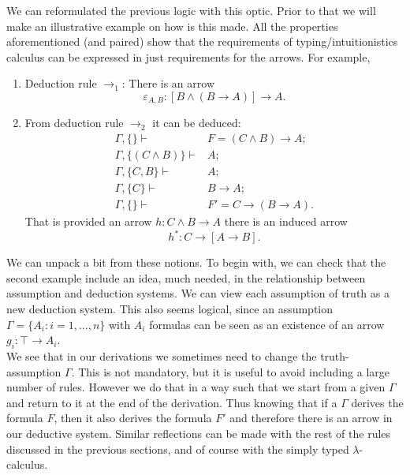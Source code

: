 We can reformulated the previous logic with this optic. Prior to that we will make an illustrative example on how is this made. All the properties aforementioned (and paired) show that the requirements of typing/intuitionistics calculus can be expressed in just requirements for the arrows. For example, 
\begin{example}
  \begin{enumerate}
  \item Deduction rule $\to_1$: There is an arrow $$\varepsilon_{A,B}: [B\land (B \to A)] \to A.$$
  \item From deduction rule $\to_2$ it can be deduced:
    \begin{align*}
      \Gamma,\{\} \vdash & F= (C\land B)\to A;\\
      \Gamma, \{(C\land B)\} \vdash & A;\\
      \Gamma, \{C, B\} \vdash & A;\\
      \Gamma, \{C\} \vdash & B\to A;\\
      \Gamma, \{\} \vdash & F'=C \to (B \to A).
    \end{align*}
    That is provided an arrow $h: C\land B \to A$ there is an induced arrow
    $$h^*:C \to [A\to B].$$
  \end{enumerate}
\end{example}

We can unpack a bit from these notions. To begin with, we can check that the second example include an idea, much needed, in the relationship between assumption and deduction systems. We can view each assumption of truth as a new deduction system. This also seems logical, since an assumption $\Gamma = \{A_i : i=1,...,n\}$  with $A_i$ formulas can be seen as an existence of an arrow $g_i: \top \to A_i$.\\

We see that in our derivations we sometimes need to change the truth-assumption $\Gamma$. This is not mandatory, but it is useful to avoid including a large number of rules. However we do that in a way such that we start from a given $\Gamma$ and return to it at the end of the derivation. Thus knowing that if a $\Gamma$ derives the formula $F$, then it also derives the formula $F'$ and therefore there is an arrow in our deductive system. Similar reflections can be made with the rest of the rules discussed in the previous sections, and of course with the simply typed $\lambda$-calculus. \\



